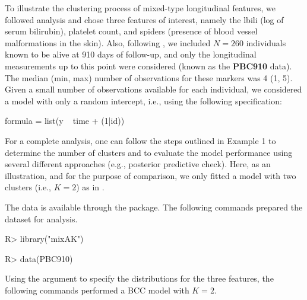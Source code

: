 To illustrate the clustering process of mixed-type longitudinal features, we followed \citet{Komarek2013} analysis and chose three features of interest, namely the lbili (log of serum bilirubin), platelet count, and spiders (presence of blood vessel malformations in the skin). Also, following \citet{Komarek2013}, we included $N = 260$ individuals known to be alive at 910 days of follow-up, and only the longitudinal measurements up to this point were considered (known as the \textbf{PBC910} data). The median (min, max) number of observations for these markers was 4 (1, 5). Given a small number of observations available for each individual, we considered a model with only a random intercept, i.e., using the following specification:

\begin{example}

     		formula = list(y ~ time + (1|id))

\end{example} 

For a complete analysis, one can follow the steps outlined in Example 1 to determine the number of clusters and to evaluate the model performance using several different approaches (e.g., posterior predictive check). Here, as an illustration, and for the purpose of comparison, we only fitted a model with two clusters (i.e., $K=2$) as in \citet{Komarek2013}. 

The data is available through the  package. The following commands prepared the dataset for analysis.

\begin{example}

R> library("mixAK")

R> data(PBC910)

\end{example} 

Using the argument  to specify the distributions for the three features, the following commands performed a BCC model with $K=2$.



